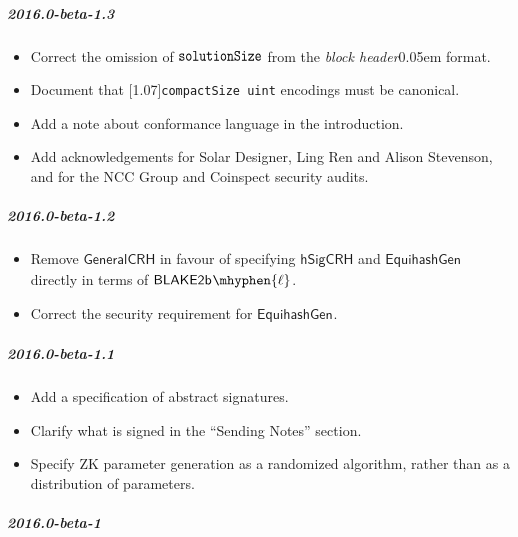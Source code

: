 \documentclass{article}
\let\oldtexttt\texttt
\let\oldmathtt\mathtt
\renewcommand{\texttt}[1]{\scalebox{0.97}[1.07]{\oldtexttt{#1}}}
\renewcommand{\mathtt}[1]{\scalebox{0.97}[1.07]{$\oldmathtt{#1}$}}
\newcommand{\introlist}{\needspace{15ex}}
\numberwithin{theorem}{subsection}
\newcommand{\term}[1]{\textsl{#1}\kern 0.05em\xspace}
\newcommand{\blockHeader}{\term{block header}}
\newcommand{\hSigCRH}{\mathsf{hSigCRH}}
\newcommand{\EquihashGen}[1]{\mathsf{EquihashGen}_{#1}}
\newcommand{\BlakeTwob}[1]{\mathsf{BLAKE2b\kern 0.05em\mhyphen{#1}}}
\newcommand{\type}[1]{\texttt{#1}}
\newcommand{\compactSize}{\type{compactSize uint}}
\newcommand{\solutionSize}{\mathtt{solutionSize}}
\begin{document}
\introlist
\subparagraph{2016.0-beta-1.3}

\begin{itemize}
    \item Correct the omission of $\solutionSize$ from the \blockHeader format.
    \item Document that \compactSize{} encodings must be canonical.
    \item Add a note about conformance language in the introduction.
    \item Add acknowledgements for Solar Designer, Ling Ren and Alison Stevenson,
          and for the NCC Group and Coinspect security audits.
\end{itemize}

\introlist
\subparagraph{2016.0-beta-1.2}

\begin{itemize}
    \item Remove $\mathsf{GeneralCRH}$ in favour of specifying $\hSigCRH$ and
          $\EquihashGen{}$ directly in terms of $\BlakeTwob{\ell}$.
    \item Correct the security requirement for $\EquihashGen{}$.
\end{itemize}

\introlist
\subparagraph{2016.0-beta-1.1}

\begin{itemize}
    \item Add a specification of abstract signatures.
    \item Clarify what is signed in the ``Sending Notes'' section.
    \item Specify ZK parameter generation as a randomized algorithm, rather
          than as a distribution of parameters.
\end{itemize}

\introlist
\subparagraph{2016.0-beta-1}
\end{document}
